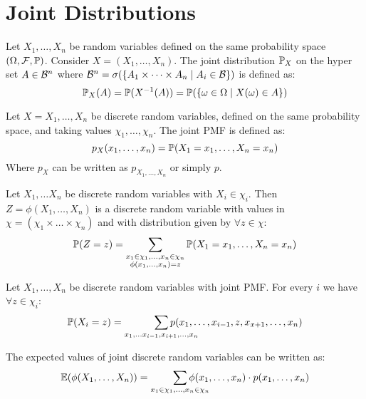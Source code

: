\section{Joint Distributions}
\begin{definition*}
  Let \(X_1, \ldots, X_n\) be random variables defined on the same probability space \((\O, \F, \P)\). Consider \(X = (X_1, \ldots, X_n)\). The joint distribution \(\P_X\) on the hyper set \(A \in \B^n\) where \(\B^n = \sigma(\{A_1 \times \cdots \times A_n \mid A_i \in \B\})\) is defined as:
  \[\P_X(A) = \P(X^{-1}(A)) = \P(\{\omega \in \O \mid X(\omega) \in A\})\]
\end{definition*}

\begin{ddefinition*}
  Let \(X = X_1, \ldots, X_n\) be discrete random variables, defined on the same probability space, and taking values \(\chi_1, \ldots, \chi_n\). The joint PMF is defined as:
  \[p_{X}(x_1, \ldots, x_n) = \P(X_1 = x_1, \ldots, X_n = x_n)\]
  Where \(p_X\) can be written as \(p_{X_1, \ldots, X_n}\) or simply \(p\).
\end{ddefinition*}

\begin{proposition}
  Let \(X_1, \ldots X_n\) be discrete random variables with \(X_i \in \chi_i\). Then \(Z = \phi(X_1, \ldots, X_n)\) is a discrete random variable with values in \(\chi = (\chi_1 \times \ldots \times \chi_n)\) and with distribution given by \(\forall z \in \chi\):
  \[\P(Z = z) = \sum_{\substack{x_1 \in \chi_1, \ldots, x_n \in \chi_n \\ \phi(x_1, \ldots, x_n) = z}} \P(X_1 = x_1, \ldots, X_n = x_n)\]
\end{proposition}

\begin{dtheorem*}
  Let \(X_1, \ldots, X_n\) be discrete random variables with joint PMF. For every \(i\) we have \(\forall z \in \chi_i\):
  \[\P(X_i = z) = \smashoperator[r]{\sum_{x_1, \ldots x_{i-1}, x_{i+1}, \ldots, x_n}} p(x_1, \ldots, x_{i-1}, z, x_{x+1}, \ldots, x_n)\]
\end{dtheorem*}

\begin{proposition}
  The expected values of joint discrete random variables can be written as:
  \[\E(\phi(X_1, \ldots, X_n)) = \smashoperator[r]{\sum_{x_1 \in \chi_1, \ldots, x_n \in \chi_n}} \phi(x_1, \ldots, x_n) \cdot p(x_1, \ldots, x_n)\]
\end{proposition}

